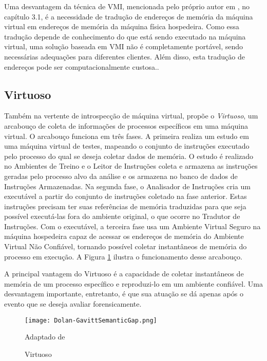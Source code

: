 Uma desvantagem da técnica de VMI, mencionada pelo próprio autor em \cite{PoiselVMI:2013}, no capítulo 3.1, é a necessidade de tradução de endereços de memória da máquina virtual em endereços de memória da máquina física hospedeira.
%
Como essa tradução depende de conhecimento do que está sendo executado na máquina virtual, uma solução baseada em VMI não é completamente portável, sendo necessárias adequações para diferentes clientes.
%
Além disso, esta tradução de endereços pode ser computacionalmente custosa..
%

\subsection{Virtuoso}
\label{sec:virtuoso}

Também na vertente de introspecção de máquina virtual, \cite{Dolan-GavittSemanticGap:2011} propõe o \textit{Virtuoso}, um arcabouço de coleta de informações de processos específicos em uma máquina virtual.
%
O arcabouço funciona em três fases.
%
A primeira realiza um estudo em uma máquina virtual de testes, mapeando o conjunto de instruções executado pelo processo do qual se deseja coletar dados de memória. 
%
O estudo é realizado no Ambientes de Treino e o Leitor de Instruções coleta e armazena as instruções geradas pelo processo alvo da análise e os armazena no banco de dados de Instruções Armazenadas.
%
Na segunda fase, o Analisador de Instruções cria um executável a partir do conjunto de instruções coletado na fase anterior. Estas instruções precisam ter suas referências de memória traduzidas para que seja possível executá-las fora do ambiente original, o que ocorre no Tradutor de Instruções.
%
Com o executável, a terceira fase usa um Ambiente Virtual Seguro na máquina hospedeira capaz de acessar os endereços de memória do Ambiente Virtual Não Confiável, tornando possível coletar instantâneos de memória do processo em execução.
%
A Figura \ref{fig:Dolan-GavittSemanticGap} ilustra o funcionamento desse arcabouço. 


A principal vantagem do Virtuoso é a capacidade de coletar instantâneos de memória de um processo específico e reproduzi-lo em um ambiente confiável.
%
Uma desvantagem importante, entretanto, é que sua atuação se dá apenas após o evento que se deseja avaliar forensicamente.
%


\begin{figure}[htb!]
\footnotesize
\caption{Virtuoso}
\texttt{[image: Dolan-GavittSemanticGap.png]}
\centering
\label{fig:Dolan-GavittSemanticGap}
\begin{center}
Adaptado de \cite{Dolan-GavittSemanticGap:2011} 
\end{center}
\end{figure}


